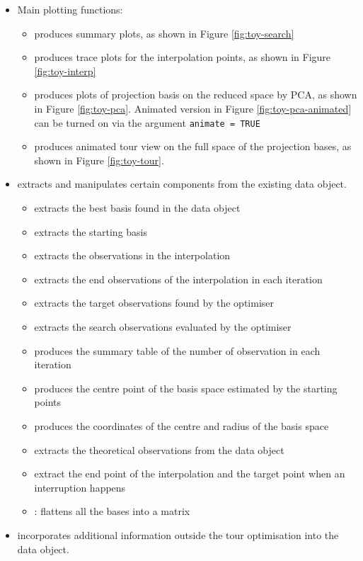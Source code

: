 \begin{itemize}
\item
  Main plotting functions:

  \begin{itemize}
  \tightlist
  \item
     produces summary plots, as shown in
    Figure \ref{fig:toy-search}
  \item
    produces trace plots for the
    interpolation points, as shown in Figure \ref{fig:toy-interp}
  \item
     produces plots of projection basis on
    the reduced space by PCA, as shown in Figure \ref{fig:toy-pca}.
    Animated version in Figure \ref{fig:toy-pca-animated} can be turned
    on via the argument \texttt{animate\ =\ TRUE}
  \item
     produces animated tour view on the
    full space of the projection bases, as shown in Figure
    \ref{fig:toy-tour}.
  \end{itemize}
\item
   extracts and manipulates certain components from the
  existing data object.

  \begin{itemize}
  \tightlist
  \item
     extracts the best basis found in the data object
  \item
     extracts the starting basis
  \item
     extracts the observations in the interpolation
  \item
     extracts the end observations of the
    interpolation in each iteration
  \item
     extracts the target observations found by the
    optimiser
  \item
     extracts the search observations evaluated by
    the optimiser
  \item
     produces the summary table of the number
    of observation in each iteration
  \item
     produces the centre point of the basis space
    estimated by the starting points
  \item
     produces the coordinates of the centre
    and radius of the basis space
  \item
     extracts the theoretical observations from the
    data object
  \item
     extract the end point of the interpolation
    and the target point when an interruption happens
  \item
    : flattens all the bases into a matrix
  \end{itemize}
\item
   incorporates additional information outside the tour
  optimisation into the data object.


\end{itemize}
